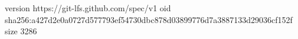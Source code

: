 version https://git-lfs.github.com/spec/v1
oid sha256:a427d2e0a0727d577793ef54730dbc878d03899776d7a3887133d29036cf152f
size 3286

